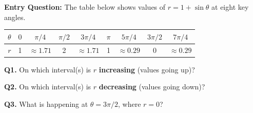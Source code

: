 \documentclass[10pt]{article}
\begin{document}
\begin{hookbox}
\textbf{Entry Question:} The table below shows values of $r = 1 + \sin\theta$
at eight key angles.

\vspace{4pt}
\renewcommand{\arraystretch}{1.4}
\begin{tabular}{|c|c|c|c|c|c|c|c|c|}
\hline
$\theta$ & $0$ & $\pi/4$ & $\pi/2$ & $3\pi/4$ & $\pi$ & $5\pi/4$ & $3\pi/2$ & $7\pi/4$ \\
\hline
$r$ & 1 & $\approx 1.71$ & 2 & $\approx 1.71$ & 1 & $\approx 0.29$ & 0 & $\approx 0.29$ \\
\hline
\end{tabular}

\vspace{8pt}
\textbf{Q1.} On which interval(s) is $r$ \textbf{increasing} (values going up)?

\vspace{4pt}
\underline{\hspace{8cm}}

\vspace{6pt}
\textbf{Q2.} On which interval(s) is $r$ \textbf{decreasing} (values going down)?

\vspace{4pt}
\underline{\hspace{8cm}}

\vspace{6pt}
\textbf{Q3.} What is happening at $\theta = 3\pi/2$, where $r = 0$?

\vspace{4pt}
\underline{\hspace{8cm}}

\end{hookbox}

\vspace{0.08in}
\end{document}
